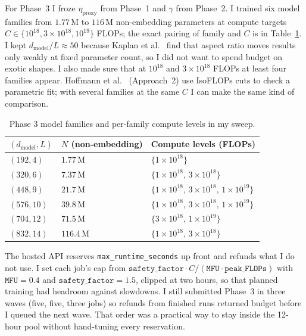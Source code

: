 \documentclass[11pt]{article}
\begin{document}
For Phase~3 I froze $\eta_\text{proxy}$ from Phase~1 and $\gamma$ from Phase~2. I trained six model families from $1.77\,\text{M}$ to $116\,\text{M}$ non-embedding parameters at compute targets $C \in \{10^{18}, 3\times 10^{18}, 10^{19}\}$ FLOPs; the exact pairing of family and $C$ is in Table~\ref{tab:phase3-design}. I kept $d_\text{model}/L \approx 50$ because Kaplan et al.~\cite{kaplan2020} find that aspect ratio moves results only weakly at fixed parameter count, so I did not want to spend budget on exotic shapes. I also made sure that at $10^{18}$ and $3\times 10^{18}$ FLOPs at least four families appear. Hoffmann et al.~\cite{hoffmann2022} (Approach~2) use IsoFLOPs cuts to check a parametric fit; with several families at the same $C$ I can make the same kind of comparison.

\begin{table}[H]
    \centering
    \begin{tabular}{lll}
        \toprule
        $(d_\text{model}, L)$ & $N$ (non-embedding) & Compute levels (FLOPs) \\
        \midrule
        $(192, 4)$  & $1.77\,\text{M}$  & $\{1\!\times\!10^{18}\}$ \\
        $(320, 6)$  & $7.37\,\text{M}$  & $\{1\!\times\!10^{18},\, 3\!\times\!10^{18}\}$ \\
        $(448, 9)$  & $21.7\,\text{M}$  & $\{1\!\times\!10^{18},\, 3\!\times\!10^{18},\, 1\!\times\!10^{19}\}$ \\
        $(576, 10)$ & $39.8\,\text{M}$  & $\{1\!\times\!10^{18},\, 3\!\times\!10^{18},\, 1\!\times\!10^{19}\}$ \\
        $(704, 12)$ & $71.5\,\text{M}$  & $\{3\!\times\!10^{18},\, 1\!\times\!10^{19}\}$ \\
        $(832, 14)$ & $116.4\,\text{M}$ & $\{1\!\times\!10^{18},\, 3\!\times\!10^{18}\}$ \\
        \bottomrule
    \end{tabular}
    \caption{Phase 3 model families and per-family compute levels in my sweep.}
    \label{tab:phase3-design}
\end{table}

The hosted API reserves \texttt{max\_runtime\_seconds} up front and refunds what I do not use. I set each job's cap from $\texttt{safety\_factor} \cdot C / (\texttt{MFU} \cdot \texttt{peak\_FLOPs})$ with $\texttt{MFU} = 0.4$ and $\texttt{safety\_factor} = 1.5$, clipped at two hours, so that planned training had headroom against slowdowns. I still submitted Phase~3 in three waves (five, five, three jobs) so refunds from finished runs returned budget before I queued the next wave. That order was a practical way to stay inside the 12-hour pool without hand-tuning every reservation.
\end{document}
